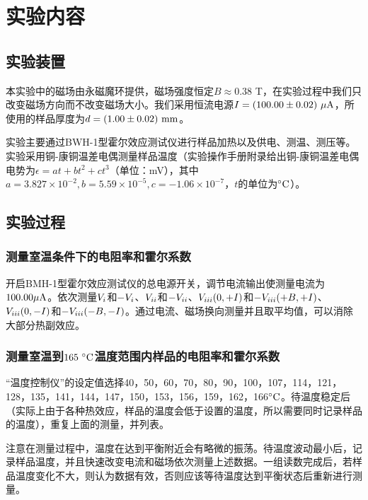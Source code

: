 \documentclass[font=default]{mpltx}
\begin{document}
\section{实验内容}
\subsection{实验装置}
本实验中的磁场由永磁魔环提供，磁场强度恒定$B\approx0.38$ T，在实验过程中我们只改变磁场方向而不改变磁场大小。我们采用恒流电源$I=(100.00\pm0.02)\ {\rm \mu A}$，所使用的样品厚度为$d=(1.00\pm0.02)\ {\rm mm}$。

实验主要通过BWH-1型霍尔效应测试仪进行样品加热以及供电、测温、测压等。实验采用铜-康铜温差电偶测量样品温度（实验操作手册附录给出铜-康铜温差电偶电势为$\epsilon=at+bt^2+ct^3$（单位：mV），其中$a=3.827\times10^{-2},b=5.59\times10^{-5},c=-1.06\times10^{-7}$，$t$的单位为$^\circ{\rm C}$\cite{manual}）。

\subsection{实验过程}
\subsubsection{测量室温条件下的电阻率和霍尔系数}
开启BMH-1型霍尔效应测试仪的总电源开关，调节电流输出使测量电流为$100.00{\rm \mu A}$。依次测量$V_{\uppercase\expandafter{\romannumeral1}}$和$-V_{\uppercase\expandafter{\romannumeral1}}$、$V_{\uppercase\expandafter{\romannumeral2}}$和$-V_{\uppercase\expandafter{\romannumeral2}}$、$V_{\uppercase\expandafter{\romannumeral3}}(0,+I)$和$-V_{\uppercase\expandafter{\romannumeral3}}(+B,+I)$、$V_{\uppercase\expandafter{\romannumeral3}}(0,-I)$和$-V_{\uppercase\expandafter{\romannumeral3}}(-B,-I)$。通过电流、磁场换向测量并且取平均值，可以消除大部分热副效应\cite{book}。

\subsubsection{测量室温到$165\ ^\circ{\rm C}$温度范围内样品的电阻率和霍尔系数}
“温度控制仪”的设定值选择40，50，60，70，80，90，100，107，114，121，128，135，141，144，147，150，153，156，159，162，166$^\circ{\rm C}$。待温度稳定后（实际上由于各种热效应，样品的温度会低于设置的温度，所以需要同时记录样品的温度），重复上面的测量，并列表。

注意在测量过程中，温度在达到平衡附近会有略微的振荡。待温度波动最小后，记录样品温度，并且快速改变电流和磁场依次测量上述数据。一组读数完成后，若样品温度变化不大，则认为数据有效，否则应该等待温度达到平衡状态后重新进行测量。
\end{document}
